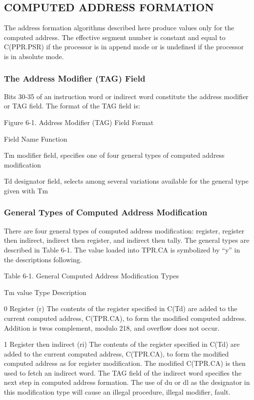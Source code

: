 \subsection{COMPUTED ADDRESS FORMATION}

The address formation algorithms described here produce values only for the
computed address. The effective segment number is constant and equal to
C(PPR.PSR) if the processor is in append mode or is undefined if the processor
is in absolute mode.

\subsubsection{The Address Modifier (TAG) Field}

Bits 30-35 of an instruction word or indirect word constitute the address modifier or TAG field. The format of the TAG field is:

Figure 6-1. Address Modifier (TAG) Field Format


Field Name Function

Tm modifier field, specifies one of four general types of computed address
modification

Td designator field, selects among several variations available for the general
type given with Tm

\subsubsection{General Types of Computed Address Modification}

There are four general types of computed address modification: register,
register then indirect, indirect then register, and indirect then tally. The
general types are described in Table 6-1. The value loaded into TPR.CA is
symbolized by {``}y'' in the descriptions following.  

Table 6-1. General Computed Address Modification Types


Tm value Type Description

0 Register (r) The contents of the register specified in C(Td) are added to the
current computed address, C(TPR.CA), to form the modified computed address.
Addition is twos complement, modulo 218, and overflow does not occur.

1 Register then indirect (ri) The contents of the register specified in C(Td)
are added to the current computed address, C(TPR.CA), to form the modified
computed address as for register modification. The modified C(TPR.CA) is then
used to fetch an indirect word. The TAG field of the indirect word specifies
the next step in computed address formation. The use of du or dl as the
designator in this modification type will cause an illegal procedure, illegal
modifier, fault.  


